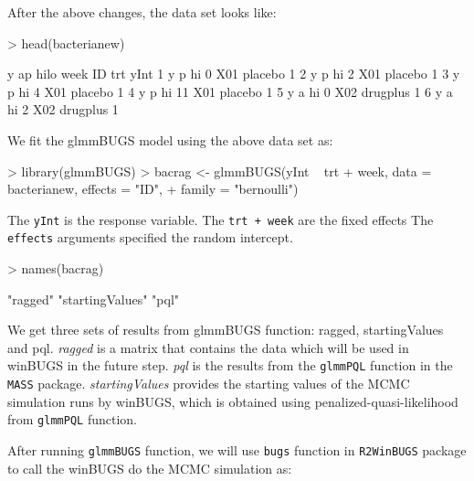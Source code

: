 \documentclass[a4paper]{report}
\begin{document}
\begin{article}
After the above changes, the data set looks like: 
\begin{Schunk}
\begin{Sinput}
> head(bacterianew)
\end{Sinput}
\begin{Soutput}
  y ap hilo week  ID      trt yInt
1 y  p   hi    0 X01  placebo    1
2 y  p   hi    2 X01  placebo    1
3 y  p   hi    4 X01  placebo    1
4 y  p   hi   11 X01  placebo    1
5 y  a   hi    0 X02 drugplus    1
6 y  a   hi    2 X02 drugplus    1
\end{Soutput}
\end{Schunk}

We fit the glmmBUGS model using the above data set as: 
\begin{Schunk}
\begin{Sinput}
> library(glmmBUGS)
> bacrag <- glmmBUGS(yInt ~ trt + week, data = bacterianew, effects = "ID", 
+     family = "bernoulli")
\end{Sinput}
\end{Schunk}

The \verb!yInt! is the response variable. 
The \verb!trt + week! are the fixed effects
The \verb!effects! arguments specified the random intercept.

\begin{Schunk}
\begin{Sinput}
> names(bacrag)
\end{Sinput}
\begin{Soutput}
[1] "ragged"         "startingValues" "pql"           
\end{Soutput}
\end{Schunk}

We get three sets of results from glmmBUGS function: ragged, startingValues and pql. 
\textit{ragged} is a matrix that contains the data which will be used in winBUGS in the future step. 
\textit{pql} is the results from the \verb!glmmPQL! function in the \verb!MASS! package.
\textit{startingValues} provides the starting values of the MCMC simulation runs by winBUGS, which is obtained using penalized-quasi-likelihood from \verb!glmmPQL! function.  


After running \verb!glmmBUGS! function, we will use \verb!bugs! function in \verb!R2WinBUGS! package
to call the winBUGS do the MCMC simulation as: 

\begin{Schunk}
\end{Schunk}


\end{article}
\end{document}

